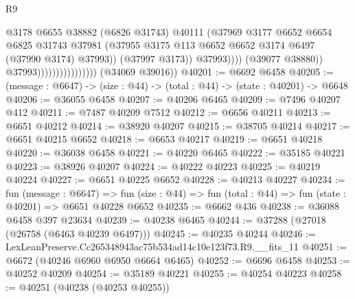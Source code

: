 \begin{lexlean}{R9}
\begin{coremodule}
                                                  @3178
                                                  @6655
                                                  @38882
                                                  (@6826 @31743)
                                                  @40111
                                                  (@37969
                                                    @3177
                                                    @6652
                                                    @6654
                                                    @6825
                                                    @31743
                                                    @37981
                                                    (@37955
                                                      @3175
                                                      @113
                                                      @6652
                                                      @6652
                                                      @3174
                                                      @6497
                                                      (@37990 @3174)
                                                      @37993))
                                                  (@37997 @3173))
                                                @37993))))
                                        (@39077 @38880))
                                      @37993))))))))))))))))
      (@34069 @39016))
@40201 := @6692 @6458
@40205 := (message : @6647) -> (size : @44) -> (total : @44) -> (state : @40201) -> @6648
@40206 := @36055 @6458
@40207 := @40206 @6465
@40209 := @7496 @40207 @412
@40211 := @7487 @40209 @7512
@40212 := @6656 @40211
@40213 := @6651 @40212
@40214 := @38920 @40207
@40215 := @38705 @40214
@40217 := @6651 @40215 @6652
@40218 := @6653 @40217
@40219 := @6651 @40218
@40220 := @36038 @6458
@40221 := @40220 @6465
@40222 := @35185 @40221
@40223 := @38926 @40207
@40224 := @40222 @40223
@40225 := @40219 @40224
@40227 := @6651 @40225 @6652
@40228 := @40213 @40227
@40234 := fun (message : @6647) =>
  fun (size : @44) => fun (total : @44) => fun (state : @40201) => @6651 @40228 @6652
@40235 := @6662 @436
@40238 := @36088 @6458 @397 @23634
@40239 := @40238 @6465
@40244 := @37288 (@27018 (@26758 (@6463 @40239 @6497)))
@40245 := @40235 @40244
@40246 := LexLeanPreserve.Cc265348943ac75b534ad14c10e123f73.R9.__fits_11
@40251 := @6672 (@40246 @6960 @6950 @6664 @6465)
@40252 := @6696 @6458
@40253 := @40252 @40209
@40254 := @35189 @40221
@40255 := @40254 @40223
@40258 := @40251 (@40238 (@40253 @40255))

\end{coremodule}
\end{lexlean}
